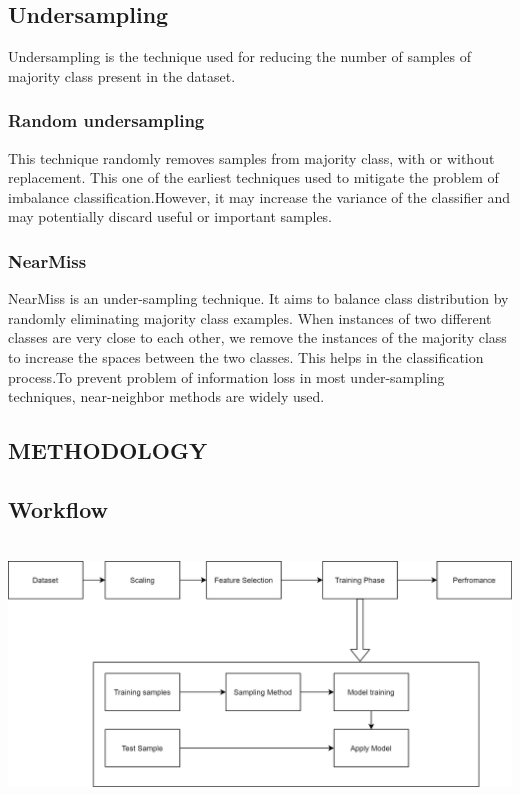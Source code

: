 \documentclass[a4paper, 12pt]{article}
\begin{document}
\subsection{Undersampling}
\par
\hspace{1cm}
Undersampling is the technique used for reducing the number of samples of majority class present in the dataset.
\par
\subsubsection{Random undersampling}
\par
\hspace{1cm}
This technique randomly removes samples from majority class, with or without replacement. This one of the earliest techniques used to mitigate the problem of imbalance classification.However, it may increase the variance of the classifier and may potentially discard useful or important samples.
\par
\subsubsection{NearMiss}
\hspace{1cm}
NearMiss is an under-sampling technique. It aims to balance class distribution by randomly eliminating majority class examples. When instances of two different classes are very close to each other, we remove the instances of the majority class to increase the spaces between the two classes. This helps in the classification process.To prevent problem of information loss in most under-sampling techniques, near-neighbor methods are widely used.


\newpage
\begin{center}
\section{METHODOLOGY}

\end{center}
\subsection{Workflow}
\par\\
\includegraphics[width=\linewidth]{./Workflow (1)}
\par\\
\newpage
\end{document}
